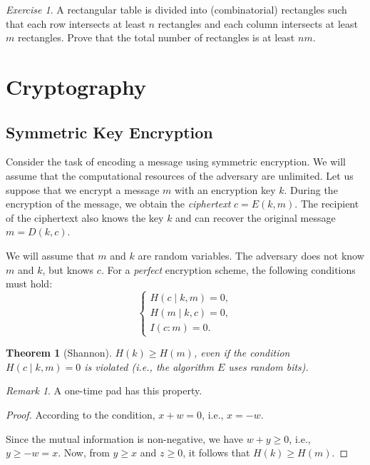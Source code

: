 \documentclass[12pt,sans]{article}
\theoremstyle{definition}
\theoremstyle{plain}
\newtheorem{theorem}{Theorem}[section]
\theoremstyle{remark}
\newtheorem{exercise}{Exercise}[section]
\newtheorem{remark}{Remark}[section]
\begin{document}
\begin{exercise}
A rectangular table is divided into (combinatorial) rectangles such that each row intersects at least \(n\) rectangles and each column intersects at least \(m\) rectangles. Prove that the total number of rectangles is at least \(nm\).
\end{exercise}


\section{Cryptography}
\subsection{Symmetric Key Encryption}

Consider the task of encoding a message using symmetric encryption. We will assume that the computational resources of the adversary are unlimited. Let us suppose that we encrypt a message $m$ with an encryption key $k$. During the encryption of the message, we obtain the \emph{ciphertext} $c = E(k, m)$. The recipient of the ciphertext also knows the key $k$ and can recover the original message $m = D(k, c)$.

We will assume that $m$ and $k$ are random variables. The adversary does not know $m$ and $k$, but knows $c$. For a \emph{perfect} encryption scheme, the following conditions must hold:
\[
\begin{cases}
    H(c \mid k, m) = 0,\\
    H(m \mid k, c) = 0,\\
    I(c : m) = 0.
\end{cases}
\]

\begin{theorem}[Shannon]
    $H(k) \ge H(m)$, even if the condition $H(c \mid k, m) = 0$ is violated
    (i.e., the algorithm $E$ uses random bits).
\end{theorem}
\begin{remark}
    A one-time pad has this property.
\end{remark}
\begin{proof}
    According to the condition, $x + w = 0$, i.e., $x = -w$.

    \begin{center}
    \end{center}
    Since the mutual information is non-negative, we have $w + y \ge 0$, i.e.,
    $y \ge -w = x$. Now, from $y \ge x$ and $z \ge 0$, it follows that $H(k) \ge H(m)$.
\end{proof}
\end{document}
